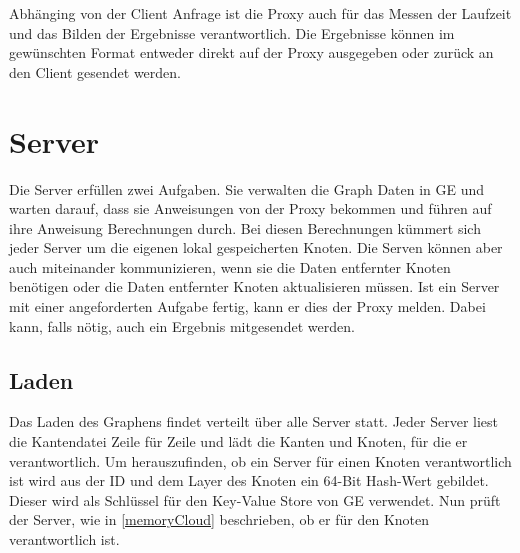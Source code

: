 Abhänging von der Client Anfrage ist die Proxy auch für das Messen der Laufzeit und das Bilden der Ergebnisse verantwortlich. Die Ergebnisse können im gewünschten Format entweder direkt auf der Proxy ausgegeben
oder zurück an den Client gesendet werden.

\section{Server}

Die Server erfüllen zwei Aufgaben. Sie verwalten die Graph Daten in GE und warten darauf, dass sie Anweisungen von der Proxy bekommen und führen auf ihre Anweisung Berechnungen durch. Bei diesen Berechnungen kümmert sich jeder Server 
um die eigenen lokal gespeicherten Knoten. Die Serven können aber auch miteinander kommunizieren, wenn sie die Daten entfernter Knoten benötigen oder die Daten entfernter Knoten
aktualisieren müssen.
Ist ein Server mit einer angeforderten Aufgabe fertig, kann er dies der Proxy melden. Dabei kann, falls nötig, auch ein Ergebnis mitgesendet werden.


\subsection{Laden}

Das Laden des Graphens findet verteilt über alle Server statt. Jeder Server liest die Kantendatei Zeile für Zeile und lädt die Kanten und Knoten, für die er verantwortlich.
Um herauszufinden, ob ein Server für einen Knoten verantwortlich ist wird aus der ID und dem Layer des Knoten ein 64-Bit Hash-Wert gebildet. Dieser wird als Schlüssel für den Key-Value Store von GE verwendet.
Nun prüft der Server, wie in \ref{memoryCloud} beschrieben, ob er für den Knoten verantwortlich ist.

